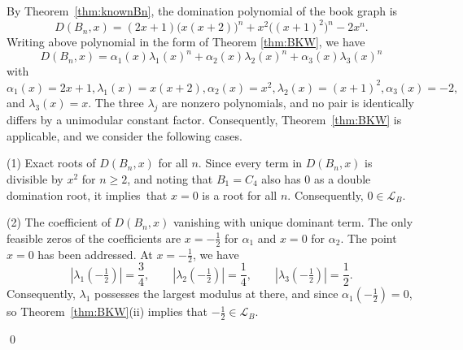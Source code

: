 \documentclass[12pt]{article}
\theoremstyle{definition}
\renewenvironment{proof}{{\noindent\bfseries Proof.}}{\qed}
\begin{document}
	\begin{proof}
		By Theorem~\ref{thm:knownBn}, the domination polynomial of the book graph is
		$$
		D(B_n,x)=(2x+1)\bigl(x(x+2)\bigr)^n+x^2\bigl((x+1)^2\bigr)^n-2x^n.
		$$
		Writing above polynomial in the form of Theorem  \ref{thm:BKW}, we have
		$$
		D(B_n,x)=\alpha_1(x)\lambda_1(x)^n+\alpha_2(x)\lambda_2(x)^n+\alpha_3(x)\lambda_3(x)^n
		$$
		with $\alpha_1(x)=2x+1, \lambda_1(x)=x(x+2),\alpha_2(x)=x^2,\lambda_2(x)=(x+1)^2, \alpha_3(x)=-2, $ and $\lambda_3(x)=x.$
		The three $\lambda_j$ are nonzero polynomials, and no pair is identically differs by a unimodular constant factor. Consequently, Theorem~\ref{thm:BKW} is applicable, and we consider the following cases.
		
		\medskip
		
		\noindent(1) Exact roots of $D(B_n,x)$ for all $n$.  Since every term in \(D(B_n,x)\) is divisible by \(x^2\) for \(n \geq 2\), and noting that \(B_1=C_4\) also has \(0\) as a double domination root, it implies that \(x=0\) is a root for all \(n\). Consequently, $0 \in \mathcal{L}_B$.
		
		\medskip
		
		\noindent(2) The coefficient of $D(B_n,x)$ vanishing with unique dominant term. The only feasible zeros of the coefficients are $x=-\tfrac{1}{2}$ for $\alpha_1$ and $x=0$ for $\alpha_2$. The point $x=0$ has been addressed. At $x=-\tfrac12$, we have
		$$
		|\lambda_1(-\tfrac12)|=\frac34,\qquad
		|\lambda_2(-\tfrac12)|=\frac14,\qquad
		|\lambda_3(-\tfrac12)|=\frac12.
		$$
		Consequently, $\lambda_1$ possesses the largest modulus at there, and since $\alpha_1(-\tfrac{1}{2})=0$, so Theorem~\ref{thm:BKW}\textup{(ii)} implies that $-\tfrac{1}{2}\in\mathcal{L}_B$.
		
		\medskip
		

\end{proof}
\end{document}
